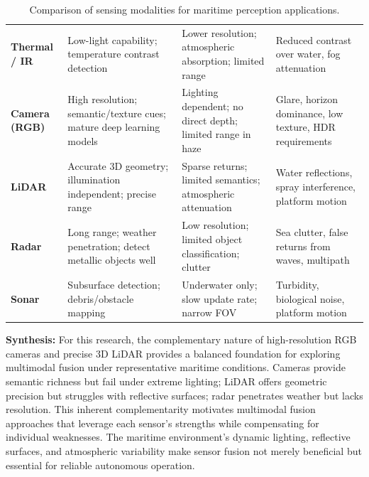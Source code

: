 \documentclass{erauthesis}
\begin{document}
\begin{table}[htbp]
\centering
\caption{Comparison of sensing modalities for maritime perception applications.}
\label{table:sensor_modalities}
\small
\renewcommand{\arraystretch}{1.2}
\begin{tabularx}{\textwidth}{L{1.8cm} L{3.4cm} L{3.4cm} Y}
\hline
{} &  &  &  \\
\hline\hline
\textbf{Thermal / IR} & 
Low-light capability; temperature contrast detection & 
Lower resolution; atmospheric absorption; limited range & 
Reduced contrast over water, fog attenuation \\
\textbf{Camera (RGB)} & 
High resolution; semantic/texture cues; mature deep learning models & 
Lighting dependent; no direct depth; limited range in haze & 
Glare, horizon dominance, low texture, HDR requirements \\
\textbf{LiDAR} & 
Accurate 3D geometry; illumination independent; precise range & 
Sparse returns; limited semantics; atmospheric attenuation & 
Water reflections, spray interference, platform motion \\
\textbf{Radar} & 
Long range; weather penetration; detect metallic objects well & 
Low resolution; limited object classification; clutter & 
Sea clutter, false returns from waves, multipath \\
\textbf{Sonar} & 
Subsurface detection; debris/obstacle mapping & 
Underwater only; slow update rate; narrow FOV & 
Turbidity, biological noise, platform motion \\
\hline
\end{tabularx}
\end{table}

\textbf{Synthesis:} 
For this research, the complementary nature of high-resolution RGB cameras and precise 3D LiDAR provides a balanced foundation for exploring multimodal fusion under representative maritime conditions.
Cameras provide semantic richness but fail under extreme lighting; LiDAR offers geometric precision but struggles with reflective surfaces; radar penetrates weather but lacks resolution. 
This inherent complementarity motivates multimodal fusion approaches that leverage each sensor's strengths while compensating for individual weaknesses. 
The maritime environment's dynamic lighting, reflective surfaces, and atmospheric variability make sensor fusion not merely beneficial but essential for reliable autonomous operation.
\end{document}
